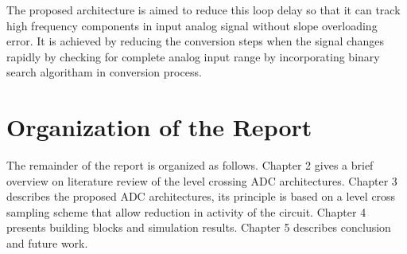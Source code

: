 \par
\hspace{0.6cm} The proposed architecture is aimed to reduce this loop delay so that it can track high frequency components in input analog signal without slope overloading error. It is achieved by reducing the conversion steps when the signal changes rapidly by checking for complete analog input range by incorporating binary search algoritham in conversion process.


\section{Organization of the Report}

\par
\hspace{1.2cm} The remainder of the report is organized as follows. Chapter 2 gives a brief overview on literature review of the level crossing ADC architectures. Chapter 3 describes the  proposed ADC architectures, its principle is based on a level cross sampling scheme that allow reduction in activity of the circuit. Chapter 4 presents building blocks and simulation results. Chapter 5 describes conclusion and future work.




